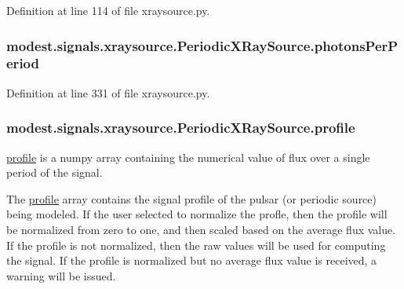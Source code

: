 Definition at line 114 of file xraysource.\+py.

\subsubsection[{\texorpdfstring{photons\+Per\+Period}{photonsPerPeriod}}]{\setlength{\rightskip}{0pt plus 5cm}modest.\+signals.\+xraysource.\+Periodic\+X\+Ray\+Source.\+photons\+Per\+Period}\hypertarget{classmodest_1_1signals_1_1xraysource_1_1PeriodicXRaySource_a25ab09a55afd1da4f019ad580770e5f4}{}\label{classmodest_1_1signals_1_1xraysource_1_1PeriodicXRaySource_a25ab09a55afd1da4f019ad580770e5f4}


Definition at line 331 of file xraysource.\+py.

\subsubsection[{\texorpdfstring{profile}{profile}}]{\setlength{\rightskip}{0pt plus 5cm}modest.\+signals.\+xraysource.\+Periodic\+X\+Ray\+Source.\+profile}\hypertarget{classmodest_1_1signals_1_1xraysource_1_1PeriodicXRaySource_a50e061bb97d0dd6ab7f344370c6b35a4}{}\label{classmodest_1_1signals_1_1xraysource_1_1PeriodicXRaySource_a50e061bb97d0dd6ab7f344370c6b35a4}


\hyperlink{classmodest_1_1signals_1_1xraysource_1_1PeriodicXRaySource_a50e061bb97d0dd6ab7f344370c6b35a4}{profile} is a numpy array containing the numerical value of flux over a single period of the signal. 

The \hyperlink{classmodest_1_1signals_1_1xraysource_1_1PeriodicXRaySource_a50e061bb97d0dd6ab7f344370c6b35a4}{profile} array contains the signal profile of the pulsar (or periodic source) being modeled. If the user selected to normalize the profle, then the profile will be normalized from zero to one, and then scaled based on the average flux value. If the profile is not normalized, then the raw values will be used for computing the signal. If the profile is normalized but no average flux value is received, a warning will be issued. 

